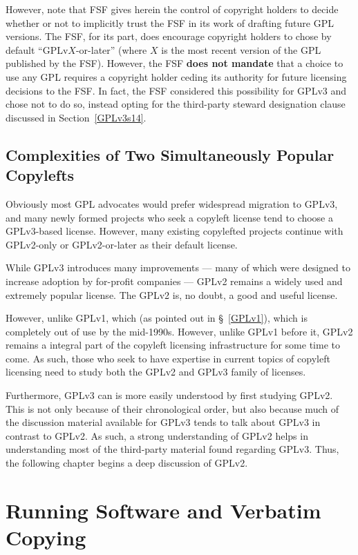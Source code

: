 However, note that FSF gives herein the control of copyright holders to
decide whether or not to implicitly trust the FSF in its work of drafting
future GPL versions.  The FSF, for its part, does encourage copyright holders
to chose by default ``GPLv$X$-or-later'' (where $X$ is the most recent
version of the GPL published by the FSF).  However, the FSF \textbf{does not
  mandate} that a choice to use any GPL requires a copyright holder ceding
its authority for future licensing decisions to the FSF.  In fact, the FSF
considered this possibility for GPLv3 and chose not to do so, instead opting
for the third-party steward designation clause discussed in
Section~\ref{GPLv3s14}.

\section{Complexities of Two Simultaneously Popular Copylefts}

Obviously most GPL advocates would prefer widespread migration to GPLv3, and
many newly formed projects who seek a copyleft license tend to choose a
GPLv3-based license.  However, many existing copylefted projects continue
with GPLv2-only or GPLv2-or-later as their default license.

While GPLv3 introduces many improvements --- many of which were designed to
increase adoption by for-profit companies --- GPLv2 remains a widely used and
extremely popular license.  The GPLv2 is, no doubt, a good and useful
license.

However, unlike GPLv1, which (as pointed out in \S~\ref{GPLv1}), which is
completely out of use by the mid-1990s.  However, unlike GPLv1 before it,
GPLv2 remains a integral part of the copyleft licensing infrastructure for
some time to come.  As such, those who seek to have expertise in current
topics of copyleft licensing need to study both the GPLv2 and GPLv3 family of
licenses.

Furthermore, GPLv3 can is more easily understood by first studying GPLv2.
This is not only because of their chronological order, but also because much
of the discussion material available for GPLv3 tends to talk about GPLv3 in
contrast to GPLv2.  As such, a strong understanding of GPLv2 helps in
understanding most of the third-party material found regarding GPLv3.  Thus,
the following chapter begins a deep discussion of GPLv2.

\chapter{Running Software and Verbatim Copying}
\label{run-and-verbatim}



